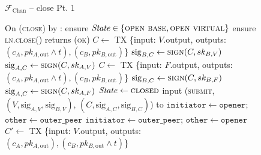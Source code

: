 \begin{figure}[H]
  \begin{systembox}{$\mathcal{F}_{\mathrm{Chan}}$ -- close Pt. 1}
    \begin{algorithmic}[1]
      \State On (\textsc{close}) by \alice:
      \Indent
        \State ensure $\mathit{State} \in \{\textsc{open base}, \textsc{open
        virtual}\}$
        \State ensure \textsc{ln.close}() returns (\textsc{ok}) 
            \State {}
            \State $C \gets$ TX \{input: $V$.output, outputs: $(c_A, pk_{A,
            \mathrm{out}} \wedge t), (c_B, pk_{B, \mathrm{out}})$\}
            \State $\mathrm{sig}_{B, C} \gets \textsc{sign}(C, sk_{B, V})$
            \State $\mathrm{sig}_{A, C} \gets \textsc{sign}(C, sk_{A, V})$
          \Else
            \State $C \gets$ TX \{input: $F$.output, outputs: $(c_A, pk_{A,
            \mathrm{out}} \wedge t), (c_B, pk_{B, \mathrm{out}})$\}
            \State $\mathrm{sig}_{B, C} \gets \textsc{sign}(C, sk_{B, F})$
            \State $\mathrm{sig}_{A, C} \gets \textsc{sign}(C, sk_{A, F})$
          \EndIf
        \EndIf \: 
        \State $\mathit{State} \gets \textsc{closed}$
          \State input (\textsc{submit}, $(V, \mathrm{sig}_{A, V},
          \mathrm{sig}_{B, V})$, $(C, \mathrm{sig}_{A, C}, \mathrm{sig}_{B,
          C})$) to \ledger
        \Else \: 
            \State $\mathtt{initiator} \gets \mathtt{opener}$; $\mathtt{other}
            \gets \mathtt{outer\_peer}$
          \Else \: 
            \State $\mathtt{initiator} \gets \mathtt{outer\_peer}$;
            $\mathtt{other} \gets \mathtt{opener}$
          \EndIf
              \State {}
              \State $C' \gets$ TX \{input: $V$.output, outputs: $(c_A, pk_{A,
              \mathrm{out}}), (c_B, pk_{B, \mathrm{out}} \wedge t)$\}

\end{algorithmic}
\end{systembox}
\end{figure}
